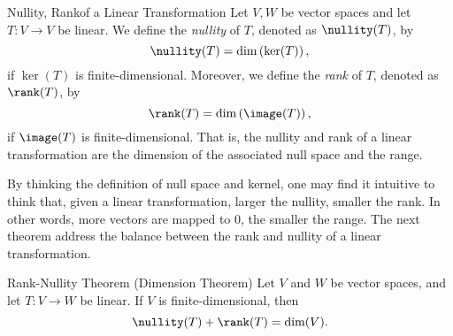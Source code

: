 \documentclass[linearalgebraI]{subfiles}
\begin{document}
    \begin{definition}{Nullity, Rank}{of a Linear Transformation}
        Let $V, W$ be vector spaces and let $T:V\to V$ be linear. We define the \emph{nullity} of $T$, denoted as $\nullity(T)$, by
        \begin{equation*}
            \nullity(T) = \dim\left( \ker(T) \right),
        \end{equation*}
        if $\ker(T)$ is finite-dimensional. Moreover, we define the \emph{rank} of $T$, denoted as $\rank(T)$, by
        \begin{equation*}
            \rank(T) = \dim\left( \image(T) \right),
        \end{equation*}
        if $\image(T)$ is finite-dimensional. That is, the nullity and rank of a linear transformation are the dimension of the associated null space and the range.
    \end{definition}

    \begin{remark}
        By thinking the definition of null space and kernel, one may find it intuitive to think that, given a linear transformation, larger the nullity, smaller the rank. In other words, more vectors are mapped to 0, the smaller the range. The next theorem address the balance between the rank and nullity of a linear transformation.
    \end{remark}

    \begin{theorem}{Rank-Nullity Theorem (Dimension Theorem)}
        Let $V$ and $W$ be vector spaces, and let $T: V\to W$ be linear. If $V$ is finite-dimensional, then
        \begin{equation*}
            \nullity(T) + \rank(T) = \dim(V).
        \end{equation*}
    \end{theorem}
\end{document}
